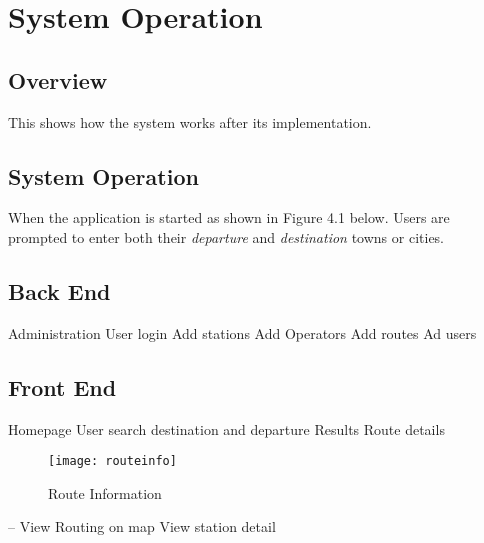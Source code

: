 
\chapter{System Operation} %



\ifpdf
    \graphicspath{{4/figures/PNG/}{4/figures/PDF/}{4/figures/}}
\else
    \graphicspath{{4/figures/EPS/}{4/figures/}}
\fi

\section{Overview}
This shows how the system works after its implementation. 

\section{System Operation}
When the application is started as shown in Figure 4.1 below. Users are prompted to enter both their \textit{departure} and \textit{destination} towns or cities.


\section{Back End}
Administration
User login
Add stations
Add Operators
Add routes
Ad users

\section{Front End}
Homepage
User search destination and departure
Results
Route details
\begin{figure}[H]
	\centering
	\texttt{[image: routeinfo]}
	\caption[Route Information]{Route Information}
	\label{fig:routeinfo}
\end{figure}

-- View Routing on map
View station detail







